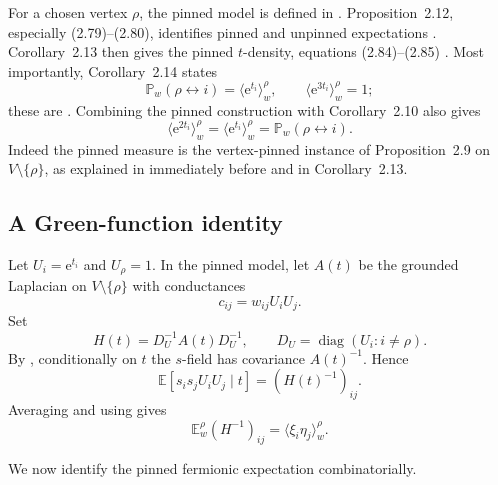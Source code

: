 \documentclass[11pt]{article}
\theoremstyle{definition}
\theoremstyle{remark}
\newcommand{\PP}{\mathbb P}
\newcommand{\EE}{\mathbb E}
\newcommand{\1}{\mathbf 1}
\newcommand{\diag}{\operatorname{diag}}
\newcommand{\e}{\mathrm e}
\begin{document}
For a chosen vertex $\rho$, the pinned model is defined in \cite[(2.77)--(2.78)]{BCHS}.
Proposition~2.12, especially (2.79)--(2.80), identifies pinned and unpinned
expectations \cite[Proposition~2.12, (2.79)--(2.80)]{BCHS}.  Corollary~2.13 then
gives the pinned $t$-density, equations (2.84)--(2.85)
\cite[Corollary~2.13, (2.84)--(2.85)]{BCHS}.  Most importantly, Corollary~2.14 states
\begin{equation}\label{eq:BCHS-pinned-connect}
 \PP_w(\rho\leftrightarrow i)=\langle\e^{t_i}\rangle_w^\rho,
 \qquad
 \langle\e^{3t_i}\rangle_w^\rho=1;
\end{equation}
these are
\cite[Corollary~2.14, (2.86)--(2.87)]{BCHS}.  Combining the pinned construction with
Corollary~2.10 also gives
\begin{equation}\label{eq:BCHS-pinned-second}
 \langle\e^{2t_i}\rangle_w^\rho
 =\langle\e^{t_i}\rangle_w^\rho
 =\PP_w(\rho\leftrightarrow i).
\end{equation}
Indeed the pinned measure is the vertex-pinned instance of Proposition~2.9 on
$V\setminus\{\rho\}$, as explained in \cite{BCHS} immediately before and in
Corollary~2.13.

\subsection{A Green-function identity}

Let $U_i=\e^{t_i}$ and $U_\rho=1$.  In the pinned model, let $A(t)$ be the grounded
Laplacian on $V\setminus\{\rho\}$ with conductances
\begin{equation}\label{eq:conductances}
 c_{ij}=w_{ij}U_iU_j.
\end{equation}
Set
\begin{equation}\label{eq:H-def}
 H(t)=D_U^{-1}A(t)D_U^{-1},
 \qquad D_U=\diag(U_i:i\neq\rho).
\end{equation}
By \cite[Proposition~2.9, (2.59)]{BCHS}, conditionally on $t$ the $s$-field has
covariance $A(t)^{-1}$.  Hence
\begin{equation}\label{eq:conditional-s}
 \EE[s_is_jU_iU_j\mid t]=(H(t)^{-1})_{ij}.
\end{equation}
Averaging and using \cite[(2.64)]{BCHS} gives
\begin{equation}\label{eq:H-fermion}
 \EE_w^\rho(H^{-1})_{ij}
 =\langle\xi_i\eta_j\rangle_w^\rho.
\end{equation}

We now identify the pinned fermionic expectation combinatorially.
\end{document}
